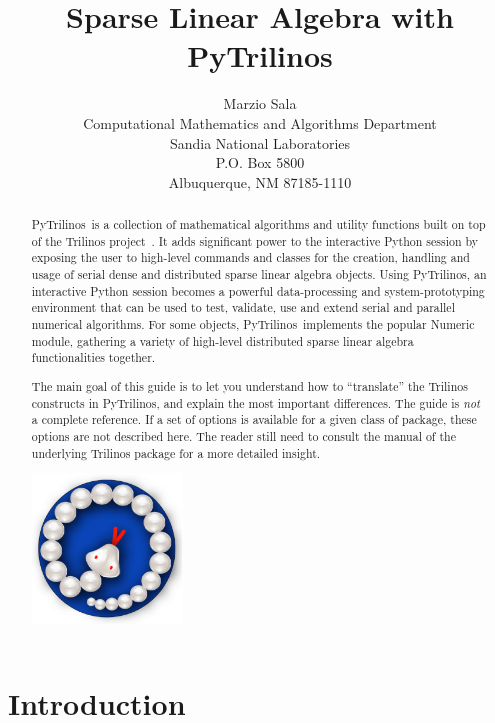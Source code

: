 \documentclass[10pt,relax]{SANDreport}
\author{Marzio Sala\\
Computational Mathematics and Algorithms Department \\
Sandia National Laboratories \\
P.O. Box 5800 \\
Albuquerque, NM 87185-1110
}
\title{Sparse Linear Algebra with PyTrilinos}
\newcommand{\PyTrilinos}{{PyTrilinos}}
\newcommand{\note}[1]{\begin{center}\fbox{\bf #1}\end{center}}
\begin{document}
\maketitle

\begin{abstract}

\note{Da riscrivere}

\PyTrilinos\ is a collection of mathematical algorithms and utility functions
built on top of the Trilinos project~\cite{Trilinos-home-page}.  It adds
significant power to the interactive Python session by exposing the user to
high-level commands and classes for the creation, handling and usage of serial
dense and distributed sparse linear algebra objects. Using \PyTrilinos, an
interactive Python session becomes a powerful data-processing and
system-prototyping environment that can be used to test, validate, use and
extend serial and parallel numerical algorithms.
For some objects, \PyTrilinos\ implements
the popular Numeric module, gathering a variety of high-level distributed
sparse linear algebra functionalities together.

The main goal of this guide is to let you understand how to ``translate'' the
Trilinos constructs in PyTrilinos, and explain the most important differences.
The guide is {\sl not} a complete reference. If a set of options is available
for a given class of package, these options are not described here. The reader
still need to consult the manual of the underlying Trilinos package for a more
detailed insight.

\bigskip

\begin{center}
\includegraphics[height=4cm]{PyTrilinos.eps}
\end{center}

\end{abstract}

\SANDmain

\tableofcontents
\newpage

\section{Introduction}
\label{chap:introduction}
\end{document}

